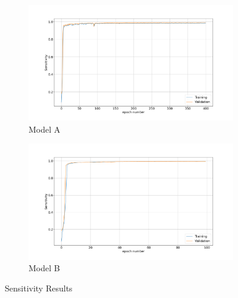 \documentclass[12pt,a4paper]{scrartcl}
\begin{document}
\begin{figure}[H]
\centering
\begin{subfigure}{1\textwidth}
  \centering
  \includegraphics[width=\linewidth]{./results/model_a_sensitivity.png}
  \caption{Model A}
  \label{fig:model_a_sensitivity}
\end{subfigure}
\begin{subfigure}{1\textwidth}
  \centering
  \includegraphics[width=\linewidth]{./results/model_b_sensitivity.png}
  \caption{Model B}
  \label{fig:modelb_sensitivity}
\end{subfigure}
\caption{Sensitivity Results}
\label{fig:sensitivity_results}
\end{figure}
\end{document}
